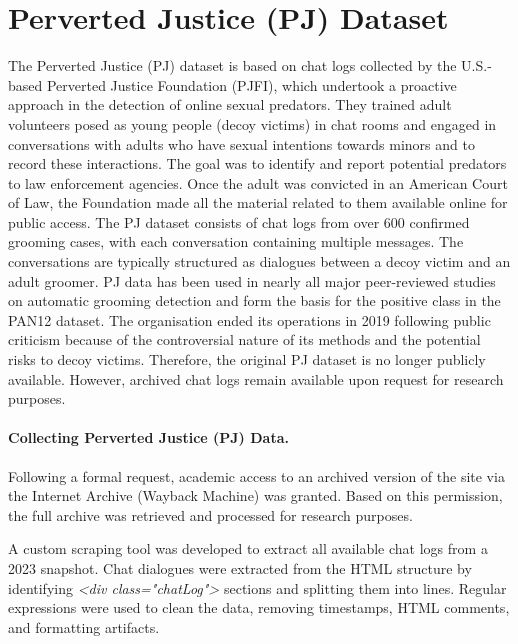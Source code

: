\section{Perverted Justice (PJ) Dataset}
The Perverted Justice (PJ) dataset \cite{pj} is based on chat logs collected by the U.S.-based Perverted Justice Foundation (PJFI), which undertook a proactive approach in the detection of online sexual predators. They trained adult volunteers posed as young people (decoy victims) in chat rooms and engaged in conversations with adults who have sexual intentions towards minors and to record these interactions. The goal was to identify and report potential predators to law enforcement agencies. Once the adult was convicted in an American Court of Law, the Foundation made all the material related to them available online for public access. The PJ dataset consists of chat logs from over 600 confirmed grooming cases, with each conversation containing multiple messages. The conversations are typically structured as dialogues between a decoy victim and an adult groomer. PJ data has been used in nearly all major peer-reviewed studies on automatic grooming detection and form the basis for the positive class in the PAN12 dataset. \cite{inches2012pan} 
The organisation ended its operations in 2019 following public criticism because of the controversial nature of its methods and the potential risks to decoy victims. Therefore, the original PJ dataset is no longer publicly available. However, archived chat logs remain available upon request for research purposes. \cite{pj}


\paragraph{Collecting Perverted Justice (PJ) Data.}

 Following a formal request, academic access to an archived version of the site via the Internet Archive (Wayback Machine) was granted. Based on this permission, the full archive was retrieved and processed for research purposes.

A custom scraping tool was developed to extract all available chat logs from a 2023 snapshot. Chat dialogues were extracted from the HTML structure by identifying \textit{<div class="chatLog">} sections and splitting them into lines. Regular expressions were used to clean the data, removing timestamps, HTML comments, and formatting artifacts. 

